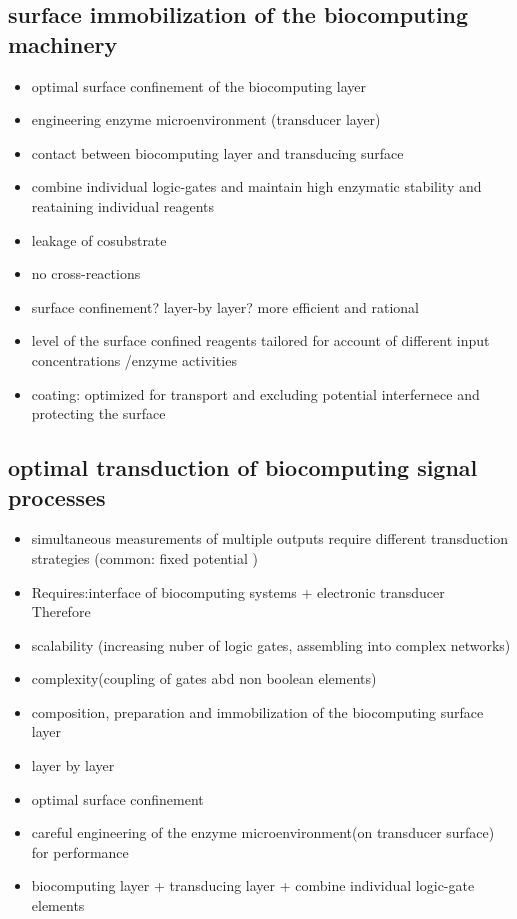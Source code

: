 \documentclass[runningheads]{llncs}
\begin{document}
\subsection{surface immobilization of the biocomputing machinery}
	\begin{itemize}
		\item optimal surface confinement of the biocomputing layer
		\item engineering enzyme microenvironment (transducer layer)
		\item contact between biocomputing layer and transducing surface
		\item combine individual logic-gates and maintain high enzymatic stability and reataining individual reagents
		\item leakage of cosubstrate 
		\item no cross-reactions
		\item surface confinement? layer-by layer? more efficient and rational 
		\item level of the surface confined reagents tailored for account of different input concentrations /enzyme activities 
		\item coating: optimized for transport and excluding potential interfernece and protecting the surface
	\end{itemize}

\subsection{optimal transduction of biocomputing signal processes}
	\begin{itemize}
		\item simultaneous measurements of multiple outputs require different transduction strategies (common: fixed potential )
	\end{itemize}
	\begin{itemize}
		\item Requires:interface of biocomputing systems + electronic transducer\\
		Therefore
		\item scalability (increasing nuber of logic gates, assembling into complex networks)
		\item complexity(coupling of gates abd non boolean elements)
		\item composition, preparation and immobilization of the biocomputing surface layer
		\item layer by layer
		\item optimal surface confinement 
		\item careful engineering of the enzyme microenvironment(on transducer surface) for performance
		\item biocomputing layer + transducing layer + combine individual logic-gate elements	
	\end{itemize}
\end{document}
